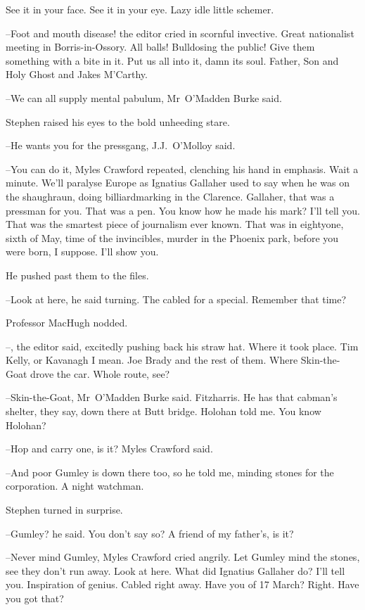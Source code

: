 See it in your face.
See it in your eye.
Lazy idle little schemer.

--Foot and mouth disease!
the editor cried in scornful invective.
Great nationalist meeting in Borris-in-Ossory.
All balls!
Bulldosing the public!
Give them something with a bite in it.
Put us all into it,
damn its soul.
Father, Son and Holy Ghost
and Jakes M'Carthy.

--We can all supply mental pabulum,
Mr~O'Madden Burke said.

Stephen raised his eyes to the bold unheeding stare.

--He wants you for the pressgang,
J.J.~O'Molloy said.



--You can do it,
Myles Crawford repeated,
clenching his hand in emphasis.
Wait a minute.
We'll paralyse Europe as Ignatius Gallaher used to say
when he was on the shaughraun,
doing billiardmarking in the Clarence.
Gallaher, that was a pressman for you.
That was a pen.
You know how he made his mark?
I'll tell you.
That was the smartest piece of journalism ever known.
That was in eightyone, sixth of May,
time of the invincibles,
murder in the Phoenix park,
before you were born, I suppose.
I'll show you.

He pushed past them to the files.

--Look at here,
he said turning.
The  cabled for a special.
Remember that time?

Professor MacHugh nodded.

--,
the editor said,
excitedly pushing back his straw hat.
Where it took place.
Tim Kelly, or Kavanagh I mean.
Joe Brady and the rest of them.
Where Skin-the-Goat drove the car.
Whole route, see?

--Skin-the-Goat,
Mr~O'Madden Burke said.
Fitzharris.
He has that cabman's shelter, they say,
down there at Butt bridge.
Holohan told me.
You know Holohan?

--Hop and carry one,
is it?
Myles Crawford said.

--And poor Gumley is down there too,
so he told me,
minding stones for the corporation.
A night watchman.

Stephen turned in surprise.

--Gumley?
he said.
You don't say so?
A friend of my father's,
is it?

--Never mind Gumley,
Myles Crawford cried angrily.
Let Gumley mind the stones,
see they don't run away.
Look at here.
What did Ignatius Gallaher do?
I'll tell you.
Inspiration of genius.
Cabled right away.
Have you  of 17 March?
Right.
Have you got that?

